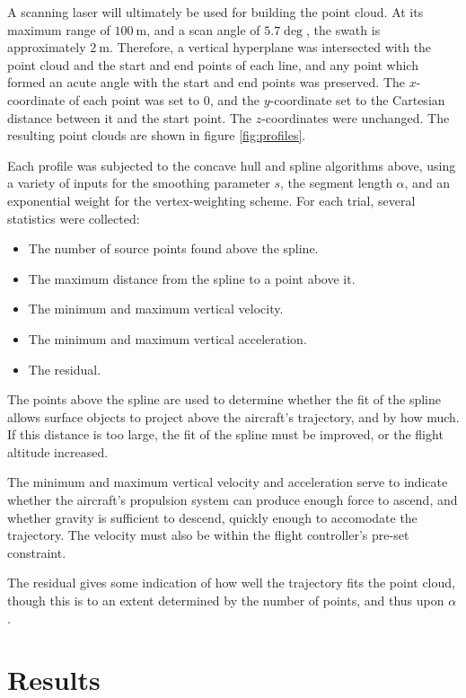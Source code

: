 \documentclass[doc]{apa6}
\begin{document}
A scanning laser will ultimately be used for building the point cloud. At its maximum range of $\SI{100}\m$, and a scan angle of $\SI{5.7}\deg$, the swath is approximately $\SI{2}\m$. Therefore, a vertical hyperplane was intersected with the point cloud and the start and end points of each line, and any point which formed an acute angle with the start and end points was preserved. The $x$-coordinate of each point was set to $0$, and the $y$-coordinate set to the Cartesian distance between it and the start point. The $z$-coordinates were unchanged. The resulting point clouds are shown in figure \ref{fig:profiles}.

Each profile was subjected to the concave hull and spline algorithms above, using a variety of inputs for the smoothing parameter $s$, the segment length $\alpha$, and an exponential weight for the vertex-weighting scheme. For each trial, several statistics were collected:

\begin{itemize}
\item The number of source points found above the spline.
\item The maximum distance from the spline to a point above it.
\item The minimum and maximum vertical velocity.
\item The minimum and maximum vertical acceleration.
\item The residual.
\end{itemize}

The points above the spline are used to determine whether the fit of the spline allows surface objects to project above the aircraft's trajectory, and by how much. If this distance is too large, the fit of the spline must be improved, or the flight altitude increased.

The minimum and maximum vertical velocity and acceleration serve to indicate whether the aircraft's propulsion system can produce enough force to ascend, and whether gravity is sufficient to descend, quickly enough to accomodate the trajectory. The velocity must also be within the flight controller's pre-set constraint.

The residual gives some indication of how well the trajectory fits the point cloud, though this is to an extent determined by the number of points, and thus upon $\alpha$.


\section{Results}





\newpage

\printbibliography
\end{document}
